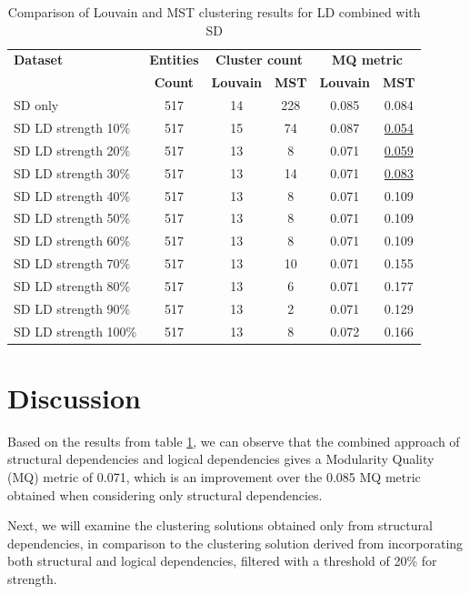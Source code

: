 \documentclass[conference]{IEEEtran}
\begin{document}
\begin{table}[htbp]
  \centering
  \caption{Comparison of Louvain and MST clustering results for LD combined with SD}
  \label{tab:clustering-results2}
  \begin{tabular}{lc|cc|cc}
    \toprule
    \textbf{Dataset} & \textbf{Entities} & \multicolumn{2}{c}{\textbf{Cluster count}} & \multicolumn{2}{c}{\textbf{MQ metric}} \\
    & \textbf{Count} & \textbf{Louvain} & \textbf{MST} & \textbf{Louvain} & \textbf{MST} \\
    \midrule
    SD only & 517 & 14 & 228 & 0.085 & 0.084 \\
    SD  LD strength 10\% & 517 & 15 & 74 & 0.087 & \underline{0.054} \\
    SD  LD strength 20\% & 517 & 13 & 8 & 0.071 & \underline{0.059} \\
    SD  LD strength 30\% & 517 & 13 & 14 & 0.071 & \underline{0.083} \\
    SD  LD strength 40\% & 517 & 13 & 8 & 0.071 & 0.109 \\
    SD  LD strength 50\% & 517 & 13 & 8 & 0.071 & 0.109 \\
    SD  LD strength 60\% & 517 & 13 & 8 & 0.071 & 0.109 \\
    SD  LD strength 70\% & 517 & 13 & 10 & 0.071 & 0.155 \\
    SD  LD strength 80\% & 517 & 13 & 6 & 0.071 & 0.177 \\
    SD  LD strength 90\% & 517 & 13 & 2 & 0.071 & 0.129 \\
    SD  LD strength 100\% & 517 & 13 & 8 & 0.072 & 0.166 \\
    \bottomrule
  \end{tabular}
\end{table}






\section{Discussion}
\label{discussion}

Based on the results from table \ref{tab:clustering-results2}, we can observe that the combined approach of structural dependencies and logical dependencies gives a Modularity Quality (MQ) metric of 0.071, which is an improvement over the 0.085 MQ metric obtained when considering only structural dependencies. 

Next, we will examine the clustering solutions obtained only from structural dependencies, in comparison to the clustering solution derived from incorporating both structural and logical dependencies, filtered with a threshold of 20\% for strength.
\end{document}
